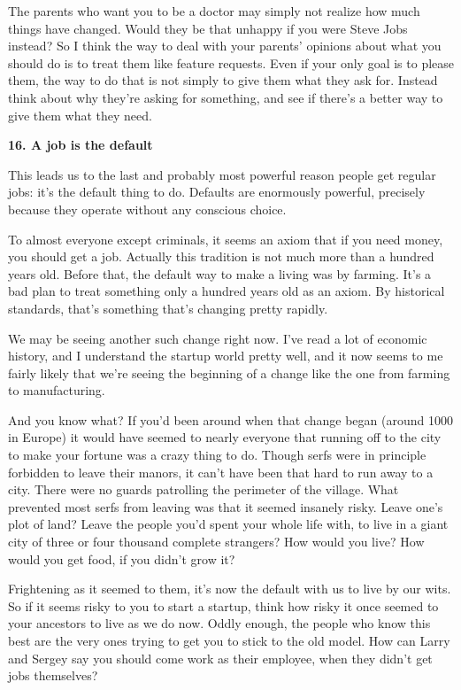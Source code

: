 \documentclass[12pt]{book}
\begin{document}
The parents who want you to be a doctor may simply not realize how much
things have changed. Would they be that unhappy if you were Steve Jobs
instead? So I think the way to deal with your parents' opinions about
what you should do is to treat them like feature requests. Even if your
only goal is to please them, the way to do that is not simply to give
them what they ask for. Instead think about why they're asking for
something, and see if there's a better way to give them what they need.

\textbf{16. A job is the default}

This leads us to the last and probably most powerful reason people get
regular jobs: it's the default thing to do. Defaults are enormously
powerful, precisely because they operate without any conscious choice.

To almost everyone except criminals, it seems an axiom that if you need
money, you should get a job. Actually this tradition is not much more
than a hundred years old. Before that, the default way to make a living
was by farming. It's a bad plan to treat something only a hundred years
old as an axiom. By historical standards, that's something that's
changing pretty rapidly.

We may be seeing another such change right now. I've read a lot of
economic history, and I understand the startup world pretty well, and it
now seems to me fairly likely that we're seeing the beginning of a
change like the one from farming to manufacturing.

And you know what? If you'd been around when that change began (around
1000 in Europe) it would have seemed to nearly everyone that running off
to the city to make your fortune was a crazy thing to do. Though serfs
were in principle forbidden to leave their manors, it can't have been
that hard to run away to a city. There were no guards patrolling the
perimeter of the village. What prevented most serfs from leaving was
that it seemed insanely risky. Leave one's plot of land? Leave the
people you'd spent your whole life with, to live in a giant city of
three or four thousand complete strangers? How would you live? How would
you get food, if you didn't grow it?

Frightening as it seemed to them, it's now the default with us to live
by our wits. So if it seems risky to you to start a startup, think how
risky it once seemed to your ancestors to live as we do now. Oddly
enough, the people who know this best are the very ones trying to get
you to stick to the old model. How can Larry and Sergey say you should
come work as their employee, when they didn't get jobs themselves?
\end{document}
